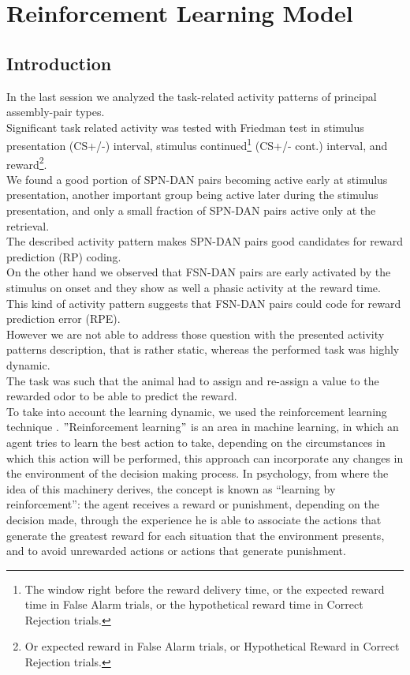 \chapter{Reinforcement Learning Model}
\label{chap:RL}
\section{Introduction}
In the last session we analyzed the task-related activity patterns of principal assembly-pair types.\\Significant task related activity was tested with Friedman test in stimulus presentation (CS+/-) interval, stimulus continued\footnote{The window right before the reward delivery time, or the expected reward time in False Alarm trials, or the hypothetical reward time in Correct Rejection trials.} (CS+/- cont.) interval, and reward\footnote{Or expected reward in False Alarm trials, or Hypothetical Reward in Correct Rejection trials.}.\\We found a good portion of SPN-DAN pairs becoming active early at stimulus presentation, another important group being active later during the stimulus presentation, and only a small fraction of SPN-DAN pairs active only at the retrieval.\\The described activity pattern makes SPN-DAN pairs good candidates for reward prediction (RP) coding.\\On the other hand we observed that FSN-DAN pairs are early activated by the stimulus on onset and they show as well a phasic activity at the reward time.\\This kind of activity pattern suggests that FSN-DAN pairs could code for reward prediction error (RPE).\\However we are not able to address those question with the presented activity patterns description, that is rather static, whereas the performed task was highly dynamic.\\The task was such that the animal had to assign and re-assign a value to the rewarded odor to be able to predict the reward.\\To take into account the learning dynamic, we used the reinforcement learning technique \cite{SuttonBarto}. $"$Reinforcement learning$"$ is an area in machine learning, in which an agent tries to learn the best action to take, depending on the circumstances in which this action will be performed, this approach can incorporate any changes in the environment of the decision making process. In psychology, from where the idea of this machinery derives, the concept is known as “learning by reinforcement”: the agent receives a reward or punishment, depending on the decision made, through the experience he is able to associate the actions that generate the greatest reward for each situation that the environment presents, and to avoid unrewarded actions or actions that generate punishment.\\
